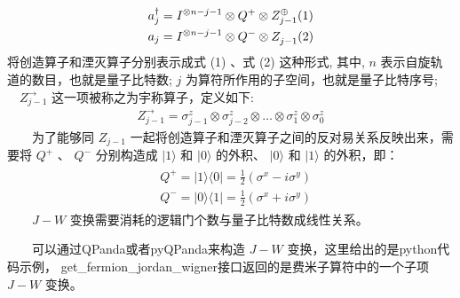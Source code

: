 \documentclass[a4paper,11pt,english]{sphinxmanual}
\begin{document}
\sphinxAtStartPar
{}
\begin{equation*}
\begin{split}\begin{aligned} &a_{j}^{\dagger}=I^{\otimes n-j-1} \otimes Q^{+} \otimes Z_{j-1}^{\oplus}(1) \\ &a_{j}=I^{\otimes n-j-1} \otimes Q^{-} \otimes Z_{j-1}^{\over{ }}(2) \end{aligned}\end{split}
\end{equation*}
\sphinxAtStartPar
将创造算子和湮灭算子分别表示成式 (1) 、式 (2) 这种形式, 其中,  \(n\) 表示自旋轨道的数目，也就是量子比特数;  \(j\) 为算符所作用的子空间，也就是量子比特序号;  \(\quad Z^{\rightarrow}_{j-1}\) 这一项被称之为宇称算子，定义如下:
\begin{equation*}
\begin{split}Z_{j-1}^{\rightarrow}=\sigma_{j-1}^{z} \otimes \sigma_{j-2}^{z} \otimes \ldots \otimes \sigma_{1}^{z} \otimes \sigma_{0}^{z}\end{split}
\end{equation*}
\sphinxAtStartPar
  为了能够同  \(Z_{j-1}\) 一起将创造算子和湮灭算子之间的反对易关系反映出来，需要将  \(Q^{+}\) 、 \(Q^{-}\) 分别构造成  \(|1\rangle\) 和  \(|0\rangle\) 的外积、  \(|0\rangle\) 和  \(|1\rangle\) 的外积，即：
\begin{equation*}
\begin{split}\begin{aligned} &Q^{+}=|1\rangle \langle0|=\frac{1}{2}\left(\sigma^{x}-i \sigma^{y}\right) \\ &Q^{-}=|0\rangle \langle1|=\frac{1}{2}\left(\sigma^{x}+i \sigma^{y}\right) \end{aligned}\end{split}
\end{equation*}
\sphinxAtStartPar
  \(J-W\) 变换需要消耗的逻辑门个数与量子比特数成线性关系。

\sphinxAtStartPar
  可以通过QPanda或者pyQPanda来构造 \(J-W\) 变换，这里给出的是python代码示例， get\_fermion\_jordan\_wigner接口返回的是费米子算符中的一个子项 \(J-W\) 变换。
\end{document}
